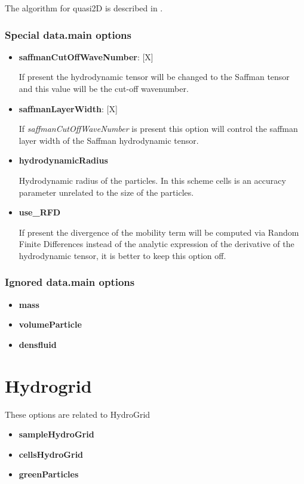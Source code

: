 \documentclass[a4paper,11pt]{refart}
\begin{document}
The algorithm for quasi2D is described in \cite{q2D}.


\subsubsection{Special data.main options}
\begin{itemize}
\item \textbf{saffmanCutOffWaveNumber}: [X]

  If present the hydrodynamic tensor will be changed to the Saffman tensor and this value will be the cut-off wavenumber.
  
\item \textbf{saffmanLayerWidth}: [X]
  
  If \emph{saffmanCutOffWaveNumber} is present this option will control the saffman layer width of the Saffman hydrodynamic tensor.
  
\item \textbf{hydrodynamicRadius}

  Hydrodynamic radius of the particles. In this scheme cells is an accuracy parameter unrelated to the size of the particles.
\item \textbf{use\_RFD}

  If present the divergence of the mobility term will be computed via Random Finite Differences instead of the analytic expression of the derivative of the hydrodynamic tensor, it is better to keep this option off.
\end{itemize}



\subsubsection{Ignored data.main options}

\begin{itemize}
\item \textbf{mass}
\item \textbf{volumeParticle}
\item \textbf{densfluid} 
\end{itemize}

\section{Hydrogrid}

These options are related to HydroGrid

\begin{itemize}
\item \textbf{sampleHydroGrid}
\item \textbf{cellsHydroGrid}
\item \textbf{greenParticles}
\end{itemize}
  


\end{document}

